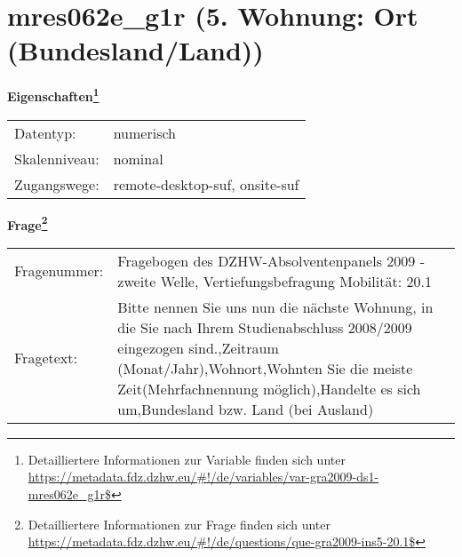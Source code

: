 
    \setcounter{footnote}{0}

    \vspace*{-1.8cm}
	\section{mres062e\_g1r (5. Wohnung: Ort (Bundesland/Land))}
	\label{section:mres062e_g1r}



    \vspace*{0.5cm}
    \noindent\textbf{Eigenschaften\footnote{Detailliertere Informationen zur Variable finden sich unter
		\url{https://metadata.fdz.dzhw.eu/\#!/de/variables/var-gra2009-ds1-mres062e_g1r$}}}\\
	\begin{tabularx}{\hsize}{@{}lX}
	Datentyp: & numerisch \\
	Skalenniveau: & nominal \\
	Zugangswege: &
	  remote-desktop-suf, 
	  onsite-suf
 \\
    \end{tabularx}



				\vspace*{0.5cm}
                \noindent\textbf{Frage\footnote{Detailliertere Informationen zur Frage finden sich unter
		              \url{https://metadata.fdz.dzhw.eu/\#!/de/questions/que-gra2009-ins5-20.1$}}}\\
				\begin{tabularx}{\hsize}{@{}lX}
					Fragenummer: &
					  Fragebogen des DZHW-Absolventenpanels 2009 - zweite Welle, Vertiefungsbefragung Mobilität:
					  20.1
 \\
					Fragetext: & Bitte nennen Sie uns nun die nächste Wohnung, in die Sie nach Ihrem Studienabschluss 2008/2009 eingezogen sind.,Zeitraum (Monat/Jahr),Wohnort,Wohnten Sie die meiste Zeit(Mehrfachnennung möglich),Handelte es sich um,Bundesland bzw. Land (bei Ausland) \\
				\end{tabularx}





